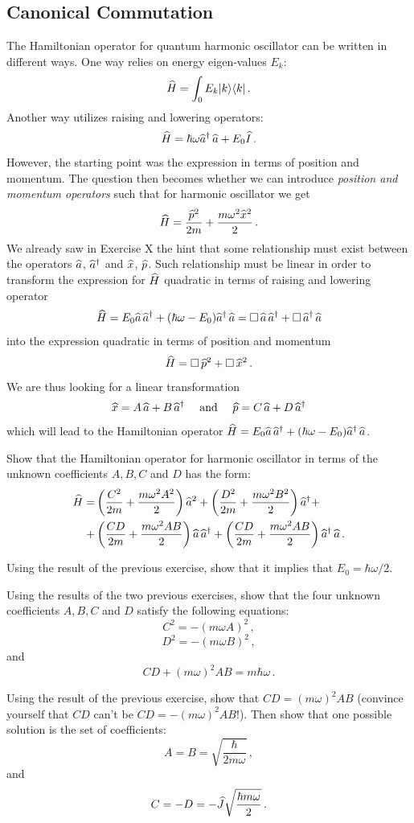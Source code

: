 \subsection{Canonical Commutation}
The Hamiltonian operator for quantum harmonic oscillator can be written in different ways. One way relies on energy eigen-values $E_k$:
\[
\widehat{H}=\int_0 E_k|{k}\rangle\langle{k}|\,.
\]
Another way utilizes raising and lowering operators:
\[
\widehat{H}=\hbar\omega \widehat{a}^\dagger\,\widehat{a}+E_0\widehat{I}\,.
\]
However, the starting point was the expression in terms of position and momentum. The question then becomes whether we can introduce \emph{position and momentum operators} such that for harmonic oscillator we get
\[
\widehat{H}=\frac{\widehat{p}^2}{2m}+\frac{m\omega^2\widehat{x}^2}{2}\,.
\]
We already saw in Exercise X the hint that some relationship must exist between the operators $\widehat{a}$, $\widehat{a}^\dagger$ and $\widehat{x}$, $\widehat{p}$. Such relationship must be linear in order to transform the expression for $\widehat{H}$ quadratic in terms of raising and lowering operator
\[
\widehat{H}=E_0\widehat{a}\,\widehat{a}^\dagger+(\hbar\omega-E_0)\widehat{a}^\dagger\,\widehat{a}=\square\,\widehat{a}\,\widehat{a}^\dagger+\square\, \widehat{a}^\dagger\,\widehat{a}
\]
into the expression quadratic in terms of position and momentum
\[
\widehat{H}=\square\, \widehat{p}^2+\square\, \widehat{x}^2\,.
\]
We are thus looking for a linear transformation
\[
\widehat{x} = A\,\widehat{a}+B\,\widehat{a}^\dagger\quad\textrm{ and }\quad \widehat{p}=C\,\widehat{a}+D\,\widehat{a}^\dagger
\]
which will lead to the Hamiltonian operator $\widehat{H}=E_0\widehat{a}\,\widehat{a}^\dagger+(\hbar\omega-E_0)\widehat{a}^\dagger\,\widehat{a}$.
\begin{exercise}
	Show that the Hamiltonian operator for harmonic oscillator in terms of the unknown coefficients $A, B, C$ and $D$ has the form:
	\begin{align*}
	\widehat{H}= & \left(\frac{C^2}{2m}+\frac{m\omega^2A^2}{2}\right)\widehat{a}^2+\left(\frac{D^2}{2m}+\frac{m\omega^2B^2}{2}\right)\widehat{a}^\dagger+\\
	+& \left(\frac{CD}{2m}+\frac{m\omega^2 AB}{2} \right)\widehat{a}\,\widehat{a}^\dagger+\left(\frac{CD}{2m}+\frac{m\omega^2 AB}{2} \right)\widehat{a}^\dagger\,\widehat{a}\,.
\end{align*}
\end{exercise}
\begin{exercise}
	Using the result of the previous exercise, show that it implies that $E_0=\hbar\omega/2$.
\end{exercise}
\begin{exercise}
	Using the results of the two previous exercises, show that the four unknown coefficients $A, B, C$ and $D$ satisfy the following equations:
	\[
	C^2=-(m\omega A)^2\,,
	\]
	\[
	D^2=-(m\omega B)^2\,,
	\]
	and
	\[
	CD+(m\omega)^2AB=m\hbar\omega\,.
	\]
\end{exercise}
\begin{exercise}
	Using the result of the previous exercise, show that $CD=(m\omega)^2AB$ (convince yourself that $CD$ can't be $CD=-(m\omega)^2AB$!). Then show that one possible solution is the set of coefficients:
	\[
	A=B=\sqrt{\frac{\hbar}{2m\omega}}\,,
	\]
	and
	\[
	C=-D=-\widehat{J}\sqrt{\frac{\hbar m\omega}{2}}\,.
	\]
\end{exercise}

